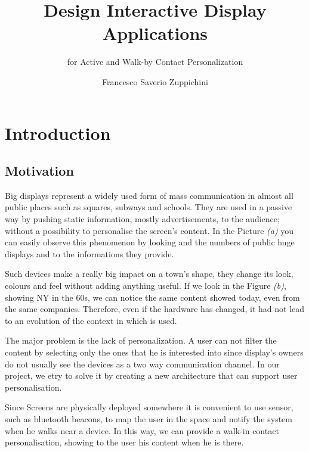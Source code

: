\documentclass[]{usiinfbachelorproject}
\author{Francesco Saverio Zuppichini}
\title{Design Interactive Display Applications}
\subtitle{for Active and Walk-by Contact Personalization}
\begin{document}
\maketitle

\section{Introduction}
\subsection{Motivation}

Big displays represent a widely used form of mass communication in almost all public places such as squares, subways and schools. They are used in a passive way by pushing static information, mostly advertisements, to the audience; without a possibility to personalise the screen's content. In the Picture \emph{(a)} you can easily observe this phenomenon by looking and the numbers of public huge displays and to the informations they provide.

Such devices make a really big impact on a town's shape, they change its look, colours and feel without adding anything useful. If we look in the Figure \emph{(b)}, showing NY in the 60s, we can notice the same content showed today, even from the same companies. Therefore, even if the hardware has changed, it had not lead to an evolution of the context in which is used. 

The major problem is the lack of personalization. A user can not filter the content by selecting only the ones that he is interested into since display's owners do not usually see the devices as a two way communication channel. In our project, we etry to solve it by creating a new architecture that can support user personalisation.

Since Screens are physically deployed somewhere it is convenient to use sensor, such as bluetooth beacons, to map the user in the space and notify the system when he walks near a device. In this way, we can provide a walk-in 
contact personalisation, showing to the user his content when he is there.
\end{document}
